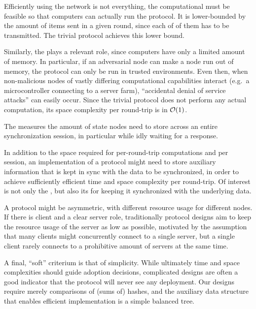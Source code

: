 Efficiently using the network is not everything, the computational
 must be feasible so that
computers can actually run the protocol. It is lower-bounded by the
amount of items sent in a given round, since each of of them has to be transmitted. The trivial protocol achieves this lower bound.

Similarly, the  plays a relevant
role, since computers have only a limited amount of memory. In
particular, if an adversarial node can make a node run out of memory,
the protocol can only be run in trusted environments. Even then, when
non-malicious nodes of vastly differing computational capabilities
interact (e.g.~a microcontroller connecting to a server farm),
``accidental denial of service attacks'' can easily occur. Since the
trivial protocol does not perform any actual computation, its space
complexity per round-trip is in $\mathcal{O}(1)$.

The  measures the amount of state
nodes need to store across an entire synchronization session, in particular
while idly waiting for a response.

In addition to the space required for per-round-trip computations and per session, an
implementation of a protocol might need to store auxiliary information
that is kept in sync with the data to be synchronized, in order to
achieve sufficiently efficient time and space complexity per round-trip.
Of interest is not only the , but also its  for keeping it
synchronized with the underlying data.

A protocol might be asymmetric, with different resource usage for different nodes.
If there is client and a clear server role, traditionally protocol designs aim to
keep the resource usage of the server as low as possible, motivated by the assumption
that many clients might concurrently connect to a single server, but a single client rarely
connects to a prohibitive amount of servers at the same time.

A final, ``soft'' criterium is that of simplicity. While ultimately time
and space complexities should guide adoption decisions, complicated
designs are often a good indicator that the protocol will never see any
deployment. Our designs require merely comparisons of (sums of) hashes,
and the auxiliary data structure that enables efficient implementation
is a simple balanced tree.

